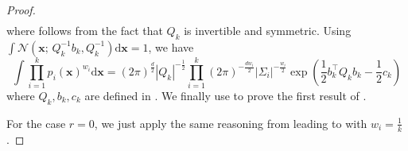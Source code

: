 \documentclass[10pt,a4paper]{amsart}
\newcommand{\vd}{\mathrm{d}}
\newcommand{\vx}{\mathbf{x}}
\begin{document}
\begin{proof}
\begin{align}
\end{align}
where  follows from the fact that $Q_k$ is invertible and symmetric. Using $\int\mathcal{N}(\vx; \, Q_k^{-1}b_k, Q_k^{-1}) \vd \vx =1 $, we have
\begin{equation}\label{eq: integral of product}
\int \prod_{i=1}^k p_i(\vx)^{w_i} \vd \vx = (2 \pi)^{\frac{d}{2}} | Q_k |^{-\frac{1}{2}}\prod_{i=1}^k (2\pi)^{-\frac{dw_i}{2}}| \Sigma_i |^{-\frac{w_i}{2}} \exp\left( \frac{1}{2} b_k^\top Q_k b_k -\frac{1}{2} c_k \right)
\end{equation}
where $Q_k,b_k,c_k$ are defined in . We finally use  to prove the first result of .

For the case $r=0$, we just apply the same reasoning from  leading to  with $w_i = \frac{1}{k}$.
\end{proof}
\end{document}
